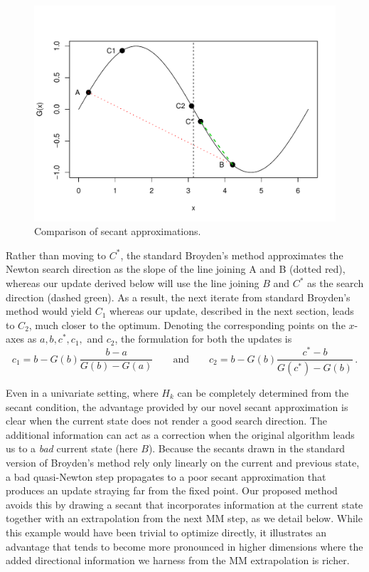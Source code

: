 \documentclass{statsoc}
\begin{document}
\begin{figure}
    \centering
    \includegraphics[width = .7\textwidth]{plots/secants.pdf}
    \caption{Comparison of secant approximations.}
    \label{fig:secants}
\end{figure}
Rather than moving to $C^\ast$, the standard Broyden's method approximates the Newton search direction as the slope of the line joining A and B (dotted red), whereas our update derived below will use the line joining $B$ and $C^*$ as the search direction (dashed green). As a result, the next iterate from standard Broyden's method would yield $C_1$ whereas our update, described in the next section, leads to $C_2$, much closer to the optimum. Denoting the corresponding points on the $x$-axes as $a, b, c^*, c_1,$ and $c_2$, the formulation for both the updates is
\[
c_1 = b - G(b)\dfrac{b - a}{G(b) - G(a)} \qquad \text{and} \qquad c_2 = b - G(b)\dfrac{c^* - b}{G(c^*) - G(b)}\,.
\]

Even in a univariate setting, where $H_k$ can be completely determined from the secant condition, the advantage provided by our novel secant approximation is clear when the current state does not render a good search direction. The additional information  can act as a correction when the original algorithm leads us to a \textit{bad} current state (here $B$). Because the secants drawn in the standard version of Broyden's method rely only linearly on the current and previous state, a bad quasi-Newton step propagates to a poor secant approximation that produces an update straying far from the fixed point. Our proposed method avoids this by drawing a secant that incorporates information at the current state together with an extrapolation from the next MM step, as we detail below. While this example would have been trivial to optimize directly, it illustrates an advantage that tends to become more pronounced in higher dimensions where the added directional information we harness from the MM extrapolation is richer.
 
\end{document}
